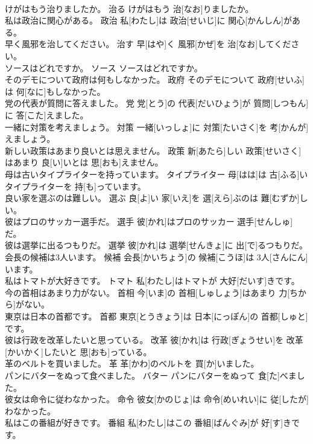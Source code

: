 \documentclass[8pt]{extreport}
\begin{document}
\begin{CJK}{UTF8}{min}
\\	けがはもう治りましたか。	治る	けがはもう 治[なお]りましたか。	
\\	私は政治に関心がある。	政治	私[わたし]は 政治[せいじ]に 関心[かんしん]がある。	
\\	早く風邪を治してください。	治す	早[はや]く 風邪[かぜ]を 治[なお]してください。	
\\	ソースはどれですか。	ソース	ソースはどれですか。	
\\	そのデモについて政府は何もしなかった。	政府	そのデモについて 政府[せいふ]は 何[なに]もしなかった。	
\\	党の代表が質問に答えました。	党	党[とう]の 代表[だいひょう]が 質問[しつもん]に 答[こた]えました。	
\\	一緒に対策を考えましょう。	対策	一緒[いっしょ]に 対策[たいさく]を 考[かんが]えましょう。	
\\	新しい政策はあまり良いとは思えません。	政策	新[あたら]しい 政策[せいさく]はあまり 良[い]いとは 思[おも]えません。	
\\	母は古いタイプライターを持っています。	タイプライター	母[はは]は 古[ふる]いタイプライターを 持[も]っています。	
\\	良い家を選ぶのは難しい。	選ぶ	良[よ]い 家[いえ]を 選[えら]ぶのは 難[むずか]しい。	
\\	彼はプロのサッカー選手だ。	選手	彼[かれ]はプロのサッカー 選手[せんしゅ]だ。	
\\	彼は選挙に出るつもりだ。	選挙	彼[かれ]は 選挙[せんきょ]に 出[で]るつもりだ。	
\\	会長の候補は3人います。	候補	会長[かいちょう]の 候補[こうほ]は 3人[さんにん]います。	
\\	私はトマトが大好きです。	トマト	私[わたし]はトマトが 大好[だいす]きです。	
\\	今の首相はあまり力がない。	首相	今[いま]の 首相[しゅしょう]はあまり 力[ちから]がない。	
\\	東京は日本の首都です。	首都	東京[とうきょう]は 日本[にっぽん]の 首都[しゅと]です。	
\\	彼は行政を改革したいと思っている。	改革	彼[かれ]は 行政[ぎょうせい]を 改革[かいかく]したいと 思[おも]っている。	
\\	革のベルトを買いました。	革	革[かわ]のベルトを 買[か]いました。	
\\	パンにバターをぬって食べました。	バター	パンにバターをぬって 食[た]べました。	
\\	彼女は命令に従わなかった。	命令	彼女[かのじょ]は 命令[めいれい]に 従[したが]わなかった。	
\\	私はこの番組が好きです。	番組	私[わたし]はこの 番組[ばんぐみ]が 好[す]きです。	

\end{CJK}
\end{document}
